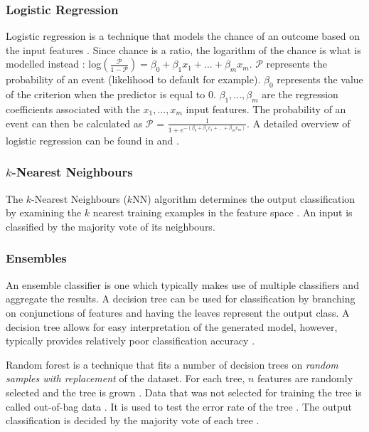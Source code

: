 \documentclass{sig-alternate-05-2015}
\begin{document}
	\subsubsection{Logistic Regression}
	Logistic regression is a technique that models the chance of an outcome based on the input features \cite{doi:10.11613/BM.2014.003}. Since chance is a ratio, the logarithm of the chance is what is modelled instead \cite{doi:10.11613/BM.2014.003}:
	log$(\frac{\mathcal{P}}{1 - \mathcal{P}}) = \beta_0 + \beta_1 x_1 + ... + \beta_m x_m$. $\mathcal{P}$ represents the probability of an event (likelihood to default for example). $\beta_0$ represents the value of the criterion when the predictor is equal to 0. $\beta_1, ..., \beta_m$ are the regression coefficients associated with the $x_1, ..., x_m$ input features. The probability of an event can then be calculated as $\mathcal{P}$ = $\frac{1}{1 + e^{-(\beta_0 + \beta_1 x_1 + ... + \beta_m x_m)}}$. A detailed overview of logistic regression can be found in \cite{Mood01022010} and \cite{doi:10.11613/BM.2014.003}.
	
	\subsubsection{$k$-Nearest Neighbours}
	The $k$-Nearest Neighbours ($k$NN) algorithm determines the output classification by examining the $k$ nearest training examples in the feature space \cite{6313426}. An input is classified by the majority vote of its neighbours.
	
	\subsubsection{Ensembles}
	An ensemble classifier is one which typically makes use of multiple classifiers and aggregate the results. A decision tree can be used for classification by branching on conjunctions of features and having the leaves represent the output class. A decision tree allows for easy interpretation of the generated model, however, typically provides relatively poor classification accuracy \cite{doi:10.1021/ci034160g}. 
	
	Random forest is a technique that fits a number of decision trees on \textit{random samples with replacement} of the dataset. For each tree, $n$ features are randomly selected and the tree is grown \cite{WIDM:WIDM1072}. Data that was not selected for training the tree is called out-of-bag data \cite{WIDM:WIDM1072}. It is used to test the error rate of the tree \cite{WIDM:WIDM1072, doi:10.1021/ci034160g}. The output classification is decided by the majority vote of each tree \cite{WIDM:WIDM1072}.
	
\end{document}
